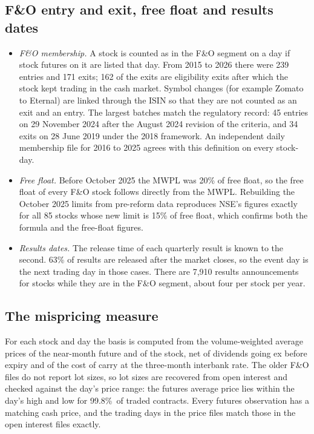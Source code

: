 \documentclass[11pt,a4paper]{article}
\newcommand{\vwapInRange}{99.8\%}
\begin{document}
\subsection{F\&O entry and exit, free float and results dates}
\begin{itemize}
\item \emph{F\&O membership.} A stock is counted as in the F\&O segment on a day if stock futures on it are listed that day.
From 2015 to 2026 there were 239 entries and 171 exits; 162 of the exits are eligibility exits after which the stock kept
trading in the cash market. Symbol changes (for example Zomato to Eternal) are linked through the ISIN so that they are not
counted as an exit and an entry. The largest batches match the regulatory record: 45 entries on 29 November 2024 after the
August 2024 revision of the criteria, and 34 exits on 28 June 2019 under the 2018 framework. An independent daily
membership file for 2016 to 2025 agrees with this definition on every stock-day.
\item \emph{Free float.} Before October 2025 the MWPL was 20\% of free float, so the free float of every F\&O stock follows
directly from the MWPL. Rebuilding the October 2025 limits from pre-reform data reproduces NSE's figures exactly for all 85
stocks whose new limit is 15\% of free float, which confirms both the formula and the free-float figures.
\item \emph{Results dates.} The release time of each quarterly result is known to the second. 63\% of results are released
after the market closes, so the event day is the next trading day in those cases. There are 7,910 results announcements for
stocks while they are in the F\&O segment, about four per stock per year.
\end{itemize}

\subsection{The mispricing measure}
For each stock and day the basis is computed from the volume-weighted average prices of the near-month future and of the
stock, net of dividends going ex before expiry and of the cost of carry at the three-month interbank rate. The older F\&O files
do not report lot sizes, so lot sizes are recovered from open interest and checked against the day's price range: the futures
average price lies within the day's high and low for \vwapInRange\ of traded contracts. Every futures observation has a
matching cash price, and the trading days in the price files match those in the open interest files exactly.
\end{document}
